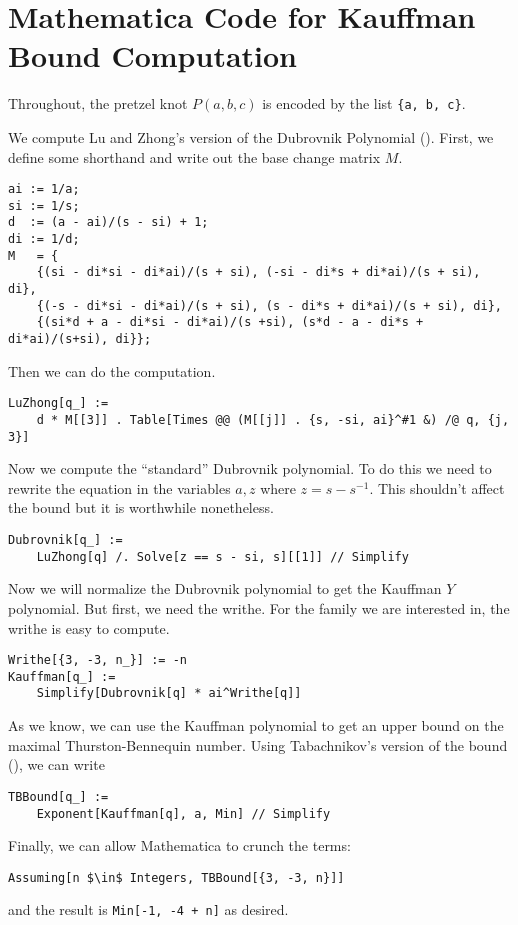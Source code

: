 \chapter{Mathematica Code for Kauffman Bound Computation}\label{ch:appendix}

\lstset{language=Mathematica,style=better}
Throughout, the pretzel knot $P(a, b, c)$ is encoded by the list \lstinline|{a, b, c}|.

We compute Lu and Zhong's version of the Dubrovnik Polynomial (\cite{lu-zhong}).
First, we define some shorthand and write out the base change matrix $M$.
\begin{lstlisting}
ai := 1/a;
si := 1/s;
d  := (a - ai)/(s - si) + 1;
di := 1/d;
M   = {
    {(si - di*si - di*ai)/(s + si), (-si - di*s + di*ai)/(s + si), di},
    {(-s - di*si - di*ai)/(s + si), (s - di*s + di*ai)/(s + si), di},
    {(si*d + a - di*si - di*ai)/(s +si), (s*d - a - di*s + di*ai)/(s+si), di}};
\end{lstlisting}

Then we can do the computation. 
\begin{lstlisting}
LuZhong[q_] :=
    d * M[[3]] . Table[Times @@ (M[[j]] . {s, -si, ai}^#1 &) /@ q, {j, 3}]
\end{lstlisting}

Now we compute the ``standard'' Dubrovnik polynomial. To do this we need to rewrite the equation in the variables $a, z$ where $z = s - s^{-1}$. This shouldn't affect the bound but it is worthwhile nonetheless.

\begin{lstlisting}
Dubrovnik[q_] :=
 	LuZhong[q] /. Solve[z == s - si, s][[1]] // Simplify
\end{lstlisting}

Now we will normalize the Dubrovnik polynomial to get the Kauffman $Y$ polynomial. But first, we need the writhe. For the family we are interested in, the writhe is easy to compute.

\begin{lstlisting}
Writhe[{3, -3, n_}] := -n
Kauffman[q_] :=
    Simplify[Dubrovnik[q] * ai^Writhe[q]]
\end{lstlisting}

As we know, we can use the Kauffman polynomial to get an upper bound on the maximal Thurston-Bennequin number. Using Tabachnikov's version of the bound (\cite{tabachnikov}), we can write

\begin{lstlisting}
TBBound[q_] :=
    Exponent[Kauffman[q], a, Min] // Simplify
\end{lstlisting}

Finally, we can allow Mathematica to crunch the terms:
\begin{lstlisting}[mathescape]
Assuming[n $\in$ Integers, TBBound[{3, -3, n}]]
\end{lstlisting}
and the result is \lstinline|Min[-1, -4 + n]| as desired.
